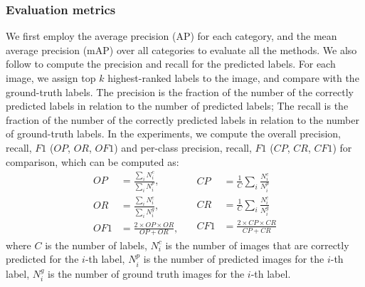 \documentclass[letterpaper]{article} %
\begin{document}
\subsubsection{Evaluation metrics}
We first employ the average precision (AP) for each category, and the mean average precision (mAP) over all categories to evaluate all the methods. We also follow \cite{gong2013deep,wang2016cnn} to compute the precision and recall for the predicted labels. For each image, we assign top $k$ highest-ranked labels to the image, and compare with the ground-truth labels. The precision is the fraction of the number of the correctly predicted labels in relation to the
number of predicted labels; The recall is the fraction of the number of the correctly predicted labels in relation to the number of ground-truth labels. In the experiments, we compute the overall precision, recall, $F1$ ($OP$, $OR$, $OF1$) and
per-class precision, recall, $F1$ ($CP$, $CR$, $CF1$) for comparison, which can be computed as:
\begin{equation}
   \begin{split}
         OP&=\frac{\sum_{i}N_{i}^{c}}{\sum_{i}N_{i}^{p}},\quad\\
         OR&=\frac{\sum_{i}N_{i}^{c}}{\sum_{i}N_{i}^{g}},\quad\\
         OF1&=\frac{2 \times OP \times OR}{OP+OR},\quad
   \end{split}
      \begin{split}
         CP&=\frac{1}{C}\sum_{i}\frac{N_{i}^{c}}{N_{i}^{p}}\\
         CR&=\frac{1}{C}\sum_{i}\frac{N_{i}^{c}}{N_{i}^{g}}\\
         CF1&=\frac{2 \times CP \times CR}{CP+CR}
   \end{split}
   \label{eqn:metric}
\end{equation}
where $C$ is the number of labels, $N_{i}^{c}$ is the number of images that are correctly predicted for the $i$-th label, $N_{i}^{p}$ is the number of predicted images for the $i$-th label, $N_{i}^{g}$ is the number of ground truth images for the $i$-th label.
\end{document}
